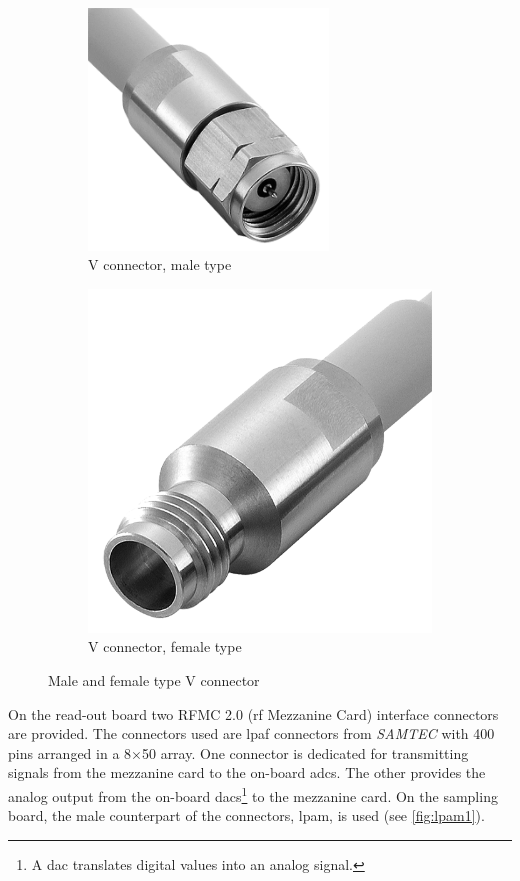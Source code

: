 \begin{figure}[H]
	\centering
	\begin{subfigure}{0.4\textwidth}
		\centering
		\includegraphics[width=0.7\textwidth]{chap/04-theresa/img/connectors/v_m}  
		\caption{V connector, male type}
		\label{fig:v_m}
	\end{subfigure}
	\hfill
	\begin{subfigure}{0.4\textwidth}
		\centering
		\includegraphics[height=0.7\textwidth]{chap/04-theresa/img/connectors/v_f}  
		\caption{V connector, female type}
		\label{fig:v_f}
	\end{subfigure}
	\caption{Male and female type V connector \cite{v_conn}}
	\label{fig:v_conn}
\end{figure}

On the read-out board two RFMC 2.0 (\gls{rf} Mezzanine Card) interface connectors are provided.
The connectors used are \gls{lpaf} connectors from \textit{SAMTEC} with 400 pins arranged in a 8$\times$50 array.
One connector is dedicated for transmitting signals from the mezzanine card to the on-board \glspl{adc}.
The other provides the analog output from the on-board \glspl{dac}\footnote{A \gls{dac} translates digital values into an analog signal.} to the mezzanine card.
On the sampling board, the male counterpart of the connectors, \gls{lpam}, is used (see \autoref{fig:lpam1}).


